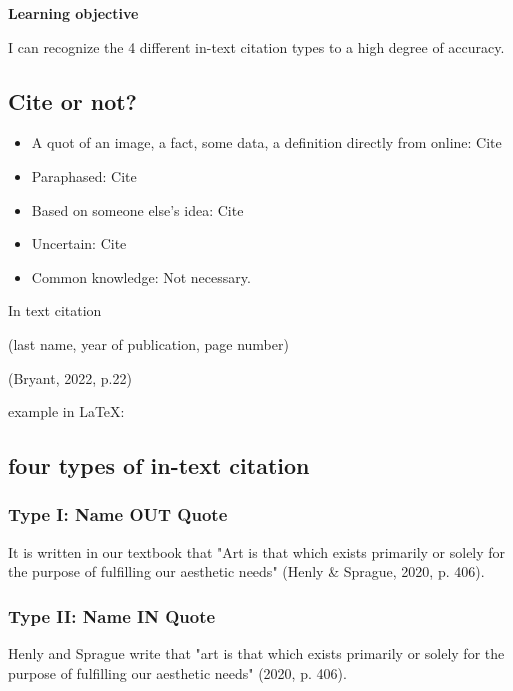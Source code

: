 \documentclass[a4paper]{article}
\begin{document}

\textbf{Learning objective}

I can recognize the 4 different in-text citation types to a high degree of accuracy.

\subsection{Cite or not?}

\begin{itemize}
    \item A quot of an image, a fact, some data, a definition directly from online: Cite
    \item Paraphased: Cite
    \item Based on someone else's idea: Cite
    \item Uncertain: Cite
    \item Common knowledge: Not necessary.
\end{itemize}

In text citation

(last name, year of publication, page number)

(Bryant, 2022, p.22)

example in LaTeX:



\subsection{four types of in-text citation}

\subsubsection{Type I: Name OUT Quote}

It is written in our textbook that "Art is that which exists primarily or solely for the purpose of fulfilling our aesthetic needs" (Henly \& Sprague, 2020, p. 406).

\subsubsection{Type II: Name IN Quote}

Henly and Sprague write that "art is that which exists primarily or solely for the purpose of fulfilling our aesthetic needs" (2020, p. 406).
\end{document}
